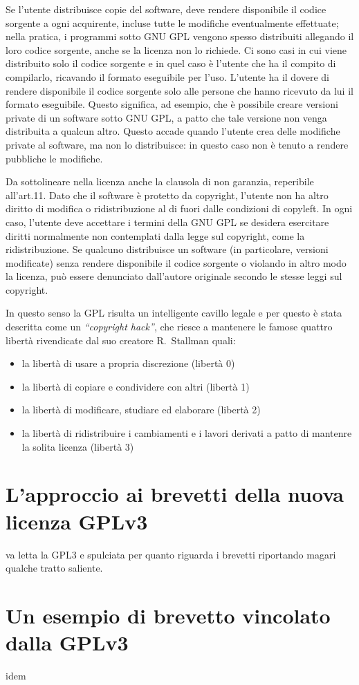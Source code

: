 Se l'utente distribuisce copie del software, deve rendere disponibile il codice sorgente a ogni acquirente, incluse tutte le modifiche eventualmente effettuate; nella pratica, i programmi sotto GNU GPL vengono spesso distribuiti allegando il loro codice sorgente, anche se la licenza non lo richiede. Ci sono casi in cui viene distribuito solo il codice sorgente e in quel caso è l'utente che ha il compito di compilarlo, ricavando il formato eseguibile per l'uso.
L'utente ha il dovere di rendere disponibile il codice sorgente solo alle persone che hanno ricevuto da lui il formato eseguibile. Questo significa, ad esempio, che è possibile creare versioni private di un software sotto GNU GPL, a patto che tale versione non venga distribuita a qualcun altro. Questo accade quando l'utente crea delle modifiche private al software, ma non lo distribuisce: in questo caso non è tenuto a rendere pubbliche le modifiche.

Da sottolineare nella licenza anche la clausola di non garanzia, reperibile all'art.11. Dato che il software è protetto da copyright, l'utente non ha altro diritto di modifica o ridistribuzione al di fuori dalle condizioni di copyleft. In ogni caso, l'utente deve accettare i termini della GNU GPL se desidera esercitare diritti normalmente non contemplati dalla legge sul copyright, come la ridistribuzione. Se qualcuno distribuisce un software (in particolare, versioni modificate) senza rendere disponibile il codice sorgente o violando in altro modo la licenza, può essere denunciato dall'autore originale secondo le stesse leggi sul copyright.

In questo senso la GPL risulta un intelligente cavillo legale e per questo è stata descritta come un \textit{``copyright hack''}, che riesce a mantenere le famose quattro libertà rivendicate dal suo creatore R.~Stallman quali:
\begin{itemize}
\item la libertà di usare a propria discrezione (libertà 0)
\item la libertà di copiare e condividere con altri (libertà 1)
\item la libertà di modificare, studiare ed elaborare (libertà 2)
\item la libertà di ridistribuire i cambiamenti e i lavori derivati a patto di mantenre la solita licenza (libertà 3)
\end{itemize}


\section{L'approccio ai brevetti della nuova licenza GPLv3}


va letta la GPL3 e spulciata per quanto riguarda i brevetti riportando magari qualche tratto saliente.


\section{Un esempio di brevetto vincolato dalla GPLv3}
idem

